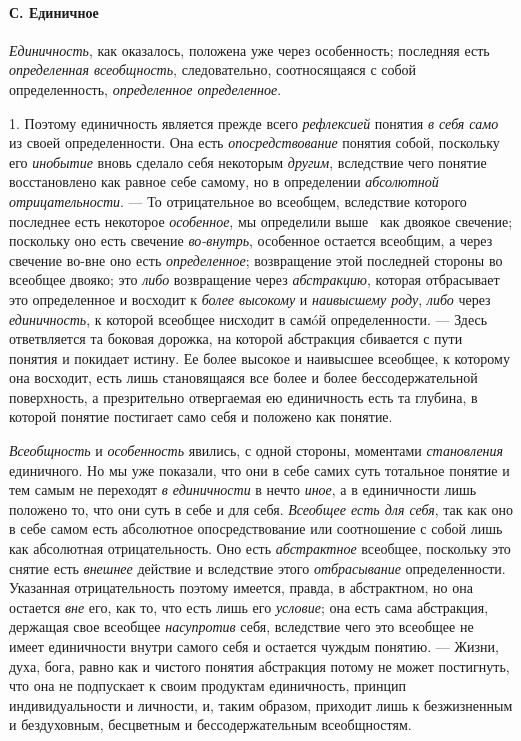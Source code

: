 \documentclass[twoside]{article}
\begin{document}
{{\paragraph[С. Единичное]{С. Единичное}
{\em Единичность}, как
оказалось, положена уже через особенность; последняя есть
{\em определенная всеобщность},
следовательно, соотносящаяся с собой определенность,
{\em определенное определенное}.

1. Поэтому единичность является прежде всего
{\em рефлексией} понятия
{\em в себя само }из
своей определенности. Она есть
{\em опосредствование}
понятия собой, поскольку его
{\em инобытие} вновь
сделало себя некоторым {\em другим},
вследствие чего понятие восстановлено как равное себе самому,
но в определении {\em абсолютной
отрицательности}. — То отрицательное во всеобщем, вследствие
которого последнее есть некоторое
{\em особенное}, мы
определили
выше~\label{bkm:bm23}
как двоякое свечение; поскольку оно есть свечение
{\em во-внутрь},
особенное остается всеобщим, а через свечение во-вне оно есть
{\em определенное};
возвращение этой последней стороны во всеобщее двояко; это
{\em либо} возвращение
через {\em абстракцию},
которая отбрасывает это определенное и восходит к
{\em более высокому} и
{\em наивысшему роду},
{\em либо} через
{\em единичность}, к
которой всеобщее нисходит в самóй определенности. — Здесь
ответвляется та боковая дорожка, на которой абстракция сбивается с пути
понятия и покидает истину. Ее более высокое и наивысшее всеобщее, к
которому она восходит, есть лишь становящаяся все более и более
бессодержательной поверхность, а презрительно отвергаемая ею единичность
есть та глубина, в которой понятие постигает само себя и положено как
понятие.

{\em Всеобщность} и
{\em особенность}
явились, с одной стороны, моментами
{\em становления}
единичного. Но мы уже показали, что они в себе самих суть
тотальное понятие и тем самым не переходят
{\em в единичности} в
нечто {\em иное}, а в
единичности лишь положено то, что они суть в себе и для себя.
{\em Всеобщее есть для себя},
так как оно в себе самом есть абсолютное опосредствование или
соотношение с собой лишь как абсолютная отрицательность. Оно есть
{\em абстрактное}
всеобщее, поскольку это снятие есть
{\em внешнее} действие и
вследствие этого {\em отбрасывание}
определенности. Указанная отрицательность поэтому имеется,
правда, в абстрактном, но она остается
{\em вне} его, как то,
что есть лишь его {\em условие};
она есть сама абстракция, держащая свое всеобщее
{\em насупротив} себя,
вследствие чего это всеобщее не имеет единичности внутри самого себя и
остается чуждым понятию. — Жизни, духа, бога, равно как и
чистого понятия абстракция потому не может постигнуть, что она не
подпускает к своим продуктам единичность, принцип индивидуальности и
личности, и, таким образом, приходит лишь к безжизненным и бездуховным,
бесцветным и бессодержательным всеобщностям.

}}
\end{document}
